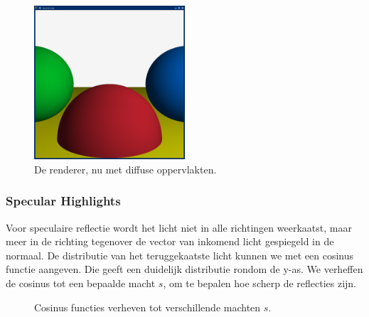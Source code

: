 \documentclass[12pt, a4paper]{article}
\begin{document}
\begin{figure}[H]
    \centering
    \includegraphics[width=0.50\textwidth]{renders/diffused.png}
    \caption{De renderer, nu met diffuse oppervlakten.}
    \label{fig:diffused}
\end{figure}

\subsubsection{Specular Highlights}

Voor speculaire reflectie wordt het licht niet in alle richtingen weerkaatst, maar meer in de richting tegenover de vector van inkomend licht gespiegeld in de normaal. De distributie van het teruggekaatste licht kunnen we met een cosinus functie aangeven. Die geeft een duidelijk distributie rondom de y-as. We verheffen de cosinus tot een bepaalde macht $s$, om te bepalen hoe scherp de reflecties zijn.

\begin{figure}[H]
    \centering
    \caption{Cosinus functies verheven tot verschillende machten $s$.}
    \label{fig:cosini}
\end{figure}
\end{document}
